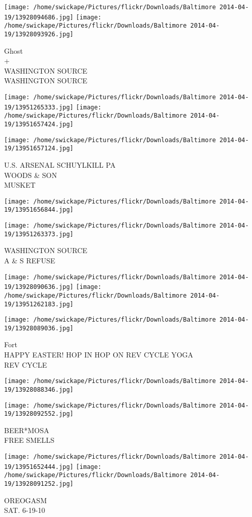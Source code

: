 \documentclass[10pt,letterpaper]{article}
\begin{document}
\texttt{[image: /home/swickape/Pictures/flickr/Downloads/Baltimore 2014-04-19/13928094686.jpg]}
\texttt{[image: /home/swickape/Pictures/flickr/Downloads/Baltimore 2014-04-19/13928093926.jpg]}

Ghost\\
+\\
WASHINGTON SOURCE\\
WASHINGTON SOURCE\\
\pagebreak

\texttt{[image: /home/swickape/Pictures/flickr/Downloads/Baltimore 2014-04-19/13951265333.jpg]}
\texttt{[image: /home/swickape/Pictures/flickr/Downloads/Baltimore 2014-04-19/13951657424.jpg]}

\vspace{0.25in}
\texttt{[image: /home/swickape/Pictures/flickr/Downloads/Baltimore 2014-04-19/13951657124.jpg]}

U.S. ARSENAL SCHUYLKILL PA\\
WOODS \& SON\\
MUSKET\\
\pagebreak

\texttt{[image: /home/swickape/Pictures/flickr/Downloads/Baltimore 2014-04-19/13951656844.jpg]}

\vspace{0.25in}
\texttt{[image: /home/swickape/Pictures/flickr/Downloads/Baltimore 2014-04-19/13951263373.jpg]}

WASHINGTON SOURCE\\
A \& S REFUSE\\
\pagebreak

\texttt{[image: /home/swickape/Pictures/flickr/Downloads/Baltimore 2014-04-19/13928090636.jpg]}
\texttt{[image: /home/swickape/Pictures/flickr/Downloads/Baltimore 2014-04-19/13951262183.jpg]}

\vspace{0.25in}
\texttt{[image: /home/swickape/Pictures/flickr/Downloads/Baltimore 2014-04-19/13928089036.jpg]}

Fort\\
HAPPY EASTER! HOP IN HOP ON REV CYCLE YOGA\\
REV CYCLE\\
\pagebreak

\texttt{[image: /home/swickape/Pictures/flickr/Downloads/Baltimore 2014-04-19/13928088346.jpg]}

\vspace{0.25in}
\texttt{[image: /home/swickape/Pictures/flickr/Downloads/Baltimore 2014-04-19/13928092552.jpg]}

BEER*MOSA\\
FREE SMELLS\\
\pagebreak

\texttt{[image: /home/swickape/Pictures/flickr/Downloads/Baltimore 2014-04-19/13951652444.jpg]}
\texttt{[image: /home/swickape/Pictures/flickr/Downloads/Baltimore 2014-04-19/13928091252.jpg]}

OREOGASM\\
SAT. 6{-}19{-}10\\
\pagebreak
\end{document}
